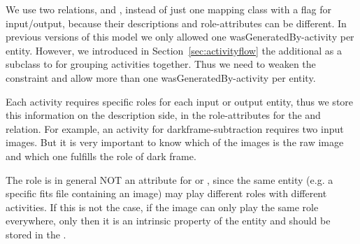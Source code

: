 We use two relations,  and , instead of just one
mapping class with a flag for input/output, because their descriptions and role-attributes
can be different. 
In previous versions of this model we only allowed one wasGeneratedBy-activity per 
entity. However, we introduced in Section~\ref{sec:activityflow} the additional  as 
a subclass to  for grouping activities together. Thus we need to 
weaken the constraint and allow more than one wasGeneratedBy-activity per entity. 

Each activity requires specific roles for each input or output entity, thus 
we store this information on the description side, in the role-attributes for 
the  and  relation.
For example, an activity for darkframe-subtraction requires two input images. But it is 
very important to know which of the images is the raw image and 
which one fulfills the role of dark frame.

The role is in general NOT an attribute for  or , 
since the same entity (e.g. a specific fits file containing an image) may play 
different roles with different activities. If this is not the case, if the 
image can only play the same role everywhere, only then it is an intrinsic 
property of the entity and should be stored in the .




